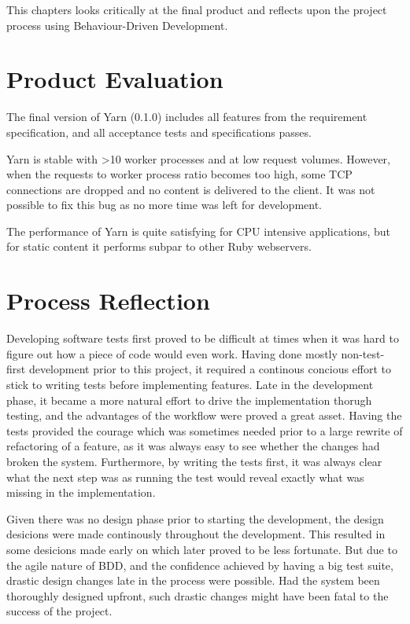This chapters looks critically at the final product and reflects upon the
project process using Behaviour-Driven Development.

\section{Product Evaluation}
The final version of Yarn (0.1.0) includes all features from the requirement
specification, and all acceptance tests and specifications passes. 

Yarn is stable with \textgreater 10 worker processes and at low request
volumes. However, when the requests to worker process ratio becomes too high,
some TCP connections are dropped and no content is delivered to the client.
It was not possible to fix this bug as no more time was left for
development.

The performance of Yarn is quite satisfying for CPU intensive applications,
but for static content it performs subpar to other Ruby webservers.

\section{Process Reflection}
Developing software tests first proved to be difficult at times when it was
hard to figure out how a piece of code would even work. Having done mostly
non-test-first development prior to this project, it required a continous
concious effort to stick to writing tests before implementing features. Late
in the development phase, it became a more natural effort to drive the
implementation thorugh testing, and the advantages of the workflow were proved
a great asset. Having the tests provided the courage which was sometimes
needed prior to a large rewrite of refactoring of a feature, as it was always
easy to see whether the changes had broken the system. Furthermore, by writing
the tests first, it was always clear what the next step was as running the
test would reveal exactly what was missing in the implementation.

Given there was no design phase prior to starting the development, the design
desicions were made continously throughout the development. This resulted in
some desicions made early on which later proved to be less fortunate. But due
to the agile nature of BDD, and the confidence achieved by having a big test
suite, drastic design changes late in the process were possible. Had the
system been thoroughly designed upfront, such drastic changes might have been
fatal to the success of the project.
